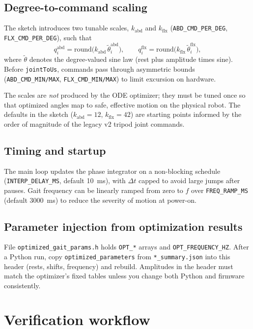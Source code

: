 \documentclass[11pt]{article}
\begin{document}
\subsection{Degree-to-command scaling}

The sketch introduces two tunable scales, $k_{\mathrm{abd}}$ and $k_{\mathrm{flx}}$ (\texttt{ABD\_CMD\_PER\_DEG}, \texttt{FLX\_CMD\_PER\_DEG}), such that
\[
q^{\mathrm{abd}}_i = \mathrm{round}\bigl(k_{\mathrm{abd}}\, \tilde{\theta}^{\mathrm{abd}}_i\bigr),\qquad
q^{\mathrm{flx}}_i = \mathrm{round}\bigl(k_{\mathrm{flx}}\, \tilde{\theta}^{\mathrm{flx}}_i\bigr),
\]
where $\tilde{\theta}$ denotes the degree-valued sine law (rest plus amplitude times sine). Before \texttt{jointToUs}, commands pass through asymmetric bounds (\texttt{ABD\_CMD\_MIN/MAX}, \texttt{FLX\_CMD\_MIN/MAX}) to limit excursion on hardware.

The scales are \emph{not} produced by the ODE optimizer; they must be tuned once so that optimized angles map to safe, effective motion on the physical robot. The defaults in the sketch ($k_{\mathrm{abd}}=12$, $k_{\mathrm{flx}}=42$) are starting points informed by the order of magnitude of the legacy v2 tripod joint commands.

\subsection{Timing and startup}

The main loop updates the phase integrator on a non-blocking schedule (\texttt{INTERP\_DELAY\_MS}, default 10~ms), with $\Delta t$ capped to avoid large jumps after pauses. Gait frequency can be linearly ramped from zero to $f$ over \texttt{FREQ\_RAMP\_MS} (default 3000~ms) to reduce the severity of motion at power-on.

\subsection{Parameter injection from optimization results}

File \texttt{optimized\_gait\_params.h} holds \texttt{OPT\_*} arrays and \texttt{OPT\_FREQUENCY\_HZ}. After a Python run, copy \texttt{optimized\_parameters} from \texttt{*\_summary.json} into this header (rests, shifts, frequency) and rebuild. Amplitudes in the header must match the optimizer's fixed tables unless you change both Python and firmware consistently.

\section{Verification workflow}
\end{document}
